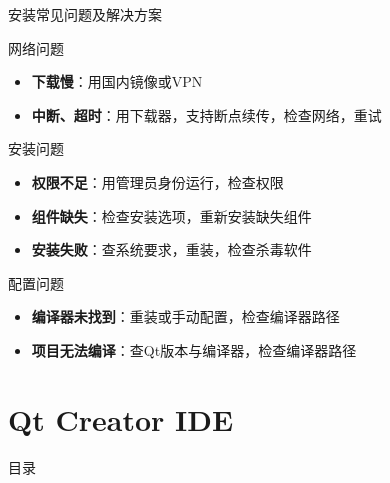 \documentclass[UTF8,aspectratio=169]{beamer}
\begin{document}
\begin{frame}{安装常见问题及解决方案}
    \begin{ytualertblock}{网络问题}
        \begin{itemize}
            \item \textbf{下载慢}：用国内镜像或VPN
            \item \textbf{中断、超时}：用下载器，支持断点续传，检查网络，重试
        \end{itemize}
    \end{ytualertblock}
    \begin{ytualertblock}{安装问题}
        \begin{itemize}
            \item \textbf{权限不足}：用管理员身份运行，检查权限
            \item \textbf{组件缺失}：检查安装选项，重新安装缺失组件
            \item \textbf{安装失败}：查系统要求，重装，检查杀毒软件
        \end{itemize}
    \end{ytualertblock}
    \begin{ytualertblock}{配置问题}
        \begin{itemize}
            \item \textbf{编译器未找到}：重装或手动配置，检查编译器路径
            \item \textbf{项目无法编译}：查Qt版本与编译器，检查编译器路径
        \end{itemize}
    \end{ytualertblock}
\end{frame}

\section{Qt Creator IDE}
\begin{frame}{目录}
    \begin{multicols}{2}
        \tableofcontents[currentsection]
    \end{multicols}
\end{frame}
\end{document}
